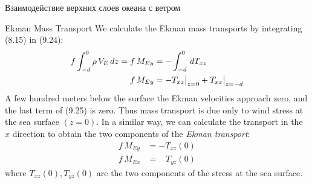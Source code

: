 \begin{chapter}{Взаимодействие верхних слоев океана с ветром}
\begin{section}{Ekman Mass Transport}
We calculate the Ekman mass transports by
integrating (8.15) in (9.24):
\begin{align}
f\int_{-d}^0\rho\,V_E\,dz =f\,M_{Ey} &=-\int_{-d}^0 \,d T_{xz}   \notag \\
f\,M_{Ey} &=-T_{xz}\big|_{z=0} + T_{xz}\big|_{z=-d}
\end{align}
A few hundred meters below the surface the Ekman velocities approach
zero, and the last term of (9.25) is zero. Thus mass
transport is due only to wind
stress at the sea
surface $(z = 0)$. In a similar way, we can calculate the transport in
the $x$ direction to obtain the two components of the \textit{Ekman
transport}:
\begin{subequations}
\begin{align}
f\,M_{Ey} &= -T_{xz}(0) \\
f\,M_{Ex} &= \;\;\; T_{yz}(0)
\end{align}
\end{subequations}
where $T_{xz}(0), T_{yz}(0)$ are the two components of the stress at
the sea surface.
%


\end{section}
\end{chapter}
